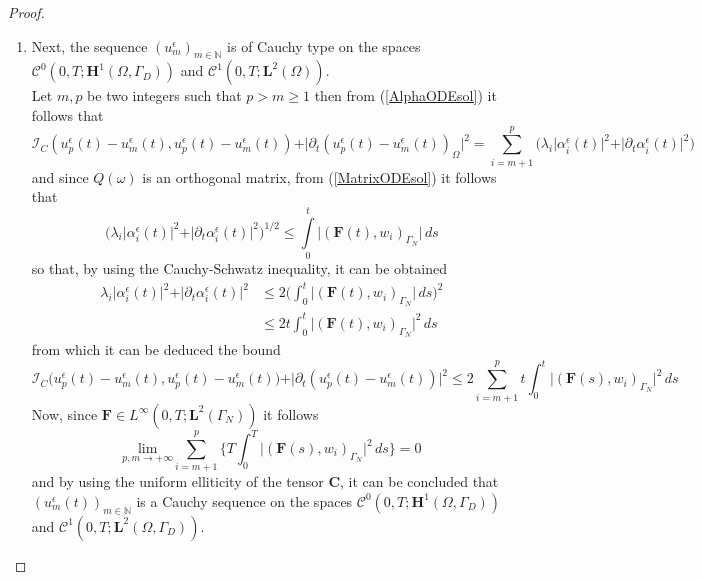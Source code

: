 \begin{proof}
\begin{enumerate}
    \item Next, the sequence $(u^{\epsilon}_m)_{m \in \mathbb{N}}$ is of Cauchy type on the spaces $\mathcal{C}^0(0,T;\mathbf{H}^1(\Omega, \Gamma_D))$ and $\mathcal{C}^1(0,T; \mathbf{L}^2(\Omega))$.\\
    Let $m,p$ be two integers such that $p > m \geq 1$ then from (\ref{AlphaODEsol}) it follows that
    \begin{equation*}
        \mathcal{I}_C(u_p^{\epsilon}(t)- u_m^{\epsilon}(t),u_p^{\epsilon}(t)- u_m^{\epsilon}(t)) + \vert \partial_t (u_p^{\epsilon}(t)- u_m^{\epsilon}(t))_{\Omega} \vert^2 = \sum_{i=m+1}^p \big( \lambda_i \vert \alpha_i^{\epsilon}(t) \vert^2 + \vert \partial_t \alpha_i^{\epsilon}(t) \vert^2 \big) 
    \end{equation*}
    and since $Q(\omega)$ is an orthogonal matrix, from (\ref{MatrixODEsol}) it follows that
    \begin{equation}
        \label{AlphaBound}
        \big( \lambda_i \vert \alpha_i^{\epsilon}(t) \vert^2 + \vert \partial_t \alpha_i^{\epsilon}(t) \vert^2 \big)^{1/2} \leq \int \limits_0^t \vert (\mathbf{F}(t),w_i)_{\Gamma_N} \vert \, ds 
    \end{equation}
    so that, by using the Cauchy-Schwatz inequality, it can be obtained
    \begin{align*}
        \lambda_i \vert \alpha_i^{\epsilon}(t) \vert^2 + \vert \partial_t \alpha_i^{\epsilon}(t) \vert^2 &\leq 2 \big( \int_0^t \vert (\mathbf{F}(t),w_i)_{\Gamma_N} \vert \, ds \big)^2 \\
        & \leq  2 t \int_0^t \vert (\mathbf{F}(t),w_i)_{\Gamma_N} \vert^2 \, ds
    \end{align*}
    from which it can be deduced the bound
    \begin{equation*}
        \mathcal{I}_C \big(u_p^{\epsilon}(t) - u_m^{\epsilon}(t),u_p^{\epsilon}(t) - u_m^{\epsilon}(t) \big) + \vert \partial_t (u_p^{\epsilon}(t) - u_m^{\epsilon}(t)) \vert^2 \leq 2 \sum_{i=m+1}^p t \int_0^t \vert (\mathbf{F}(s),w_i)_{\Gamma_N} \vert^2 \, ds
    \end{equation*}
    Now, since $\mathbf{F} \in L^{\infty}(0,T;\mathbf{L}^2( \Gamma_N))$ it follows
    \begin{equation*}
        \underset{p,m \longrightarrow + \infty}{\text{lim}} \sum_{i=m+1}^p \big \{ T \int_0^T \vert (\mathbf{F}(s),w_i)_{\Gamma_N}\vert^2 \, ds \big \} = 0
    \end{equation*}
    and by using the uniform elliticity of the tensor $\mathbf{C}$, it can be concluded that $(u_m^{\epsilon}(t))_{m \in \mathbb{N}}$ is a Cauchy sequence on the spaces $\mathcal{C}^0(0,T; \mathbf{H}^1(\Omega, \Gamma_D))$ and $\mathcal{C}^1(0,T; \mathbf{L}^2(\Omega, \Gamma_D))$.
    

\end{enumerate}
\end{proof}
